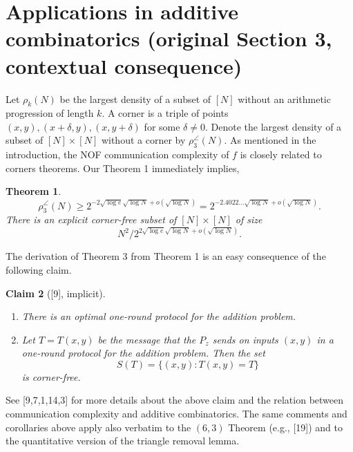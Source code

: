 \documentclass[10pt,a4paper]{article}
\newtheorem{theorem}{Theorem}
\newtheorem{claim}[theorem]{Claim}
\begin{document}
\section*{Applications in additive combinatorics (original Section 3, contextual consequence)}
Let $\rho_k(N)$ be the largest density of a subset of $[N]$ without an arithmetic progression of length $k$. A corner is a triple of points $(x,y),(x+\delta,y),(x,y+\delta)$ for some $\delta\ne0$. Denote the largest density of a subset of $[N]\times[N]$ without a corner by $\rho_3^\angle(N)$.
As mentioned in the introduction, the NOF communication complexity of $f$ is closely related to corners theorems. Our Theorem 1 immediately implies,
\begin{theorem}
\[\rho_3^\angle(N)\ge2^{-2\sqrt{\log e}\sqrt{\log N}+o(\sqrt{\log N})}=2^{-2.4022\ldots\sqrt{\log N}+o(\sqrt{\log N})}.\]
There is an explicit corner-free subset of $[N]\times[N]$ of size
\[N^2/2^{2\sqrt{\log e}\sqrt{\log N}+o(\sqrt{\log N})}.\]
\end{theorem}
The derivation of Theorem 3 from Theorem 1 is an easy consequence of the following claim.
\begin{claim}[{[9], implicit}]
\begin{enumerate}
\item There is an optimal one-round protocol for the addition problem.
\item Let $T=T(x,y)$ be the message that the $P_z$ sends on inputs $(x,y)$ in a one-round protocol for the addition problem. Then the set
\[S(T)=\{(x,y):T(x,y)=T\}\]
is corner-free.
\end{enumerate}
\end{claim}
See [9,7,1,14,3] for more details about the above claim and the relation between communication complexity and additive combinatorics. The same comments and corollaries above apply also verbatim to the $(6,3)$ Theorem (e.g., [19]) and to the quantitative version of the triangle removal lemma.
\end{document}
